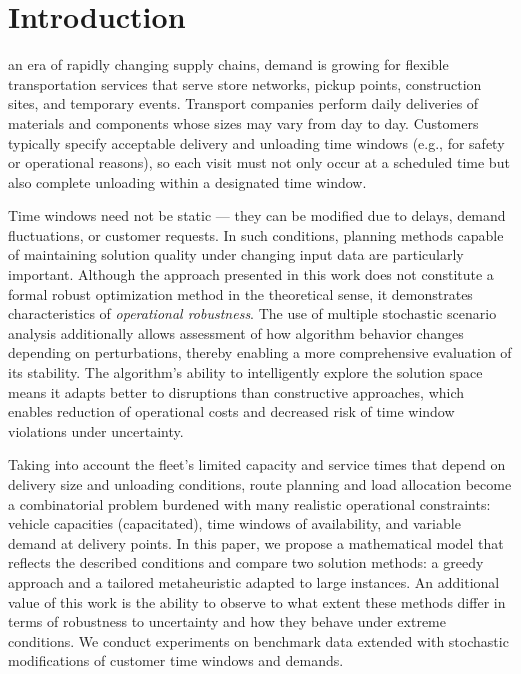 



%
%
%
%


\section{Introduction}\label{sec:introduction}
 an era of rapidly changing supply chains, demand is growing for flexible transportation services that serve store networks, pickup points, construction sites, and temporary events. Transport companies perform daily deliveries of materials and components whose sizes may vary from day to day. Customers typically specify acceptable delivery and unloading time windows (e.g., for safety or operational reasons), so each visit must not only occur at a scheduled time but also complete unloading within a designated time window.

Time windows need not be static — they can be modified due to delays, demand fluctuations, or customer requests. In such conditions, planning methods capable of maintaining solution quality under changing input data are particularly important. Although the approach presented in this work does not constitute a formal robust optimization method in the theoretical sense, it demonstrates characteristics of \emph{operational robustness}. The use of multiple stochastic scenario analysis additionally allows assessment of how algorithm behavior changes depending on perturbations, thereby enabling a more comprehensive evaluation of its stability. The algorithm's ability to intelligently explore the solution space means it adapts better to disruptions than constructive approaches, which enables reduction of operational costs and decreased risk of time window violations under uncertainty.

Taking into account the fleet's limited capacity and service times that depend on delivery size and unloading conditions, route planning and load allocation become a combinatorial problem burdened with many realistic operational constraints: vehicle capacities (capacitated), time windows of availability, and variable demand at delivery points. In this paper, we propose a mathematical model that reflects the described conditions and compare two solution methods: a greedy approach and a tailored metaheuristic adapted to large instances. An additional value of this work is the ability to observe to what extent these methods differ in terms of robustness to uncertainty and how they behave under extreme conditions. We conduct experiments on benchmark data extended with stochastic modifications of customer time windows and demands.

